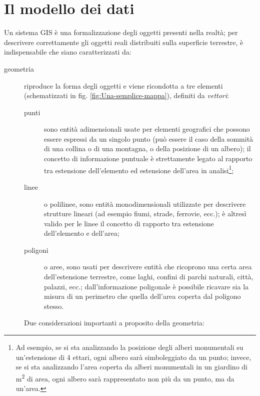 \section{Il modello dei dati
}

	Un sistema GIS è una formalizzazione degli oggetti presenti nella realtà; per descrivere correttamente gli oggetti reali distribuiti sulla superficie terrestre, è indispensabile che siano caratterizzati da:
	
	\begin{description}
		\item [{geometria}] riproduce la forma degli oggetti e viene ricondotta a tre elementi (schematizzati in fig. \ref{fig:Una-semplice-mappa}), definiti da \emph{vettori}:

			\begin{description}
				\item [{punti}] sono entità adimensionali usate per elementi geografici che possono essere espressi da un singolo punto (può essere il caso della sommità di una collina o di una montagna, o della posizione di un albero); il concetto di informazione puntuale è strettamente legato al rapporto tra estensione dell'elemento ed estensione dell'area in analisi\footnote{Ad esempio, se si sta analizzando la posizione degli alberi monumentali su un'estensione di 4 ettari, ogni albero sarà simboleggiato da un punto; invece, se si sta analizzando l'area coperta da alberi monumentali in un giardino di \unit{\meter\squared} di area, ogni albero sarà rappresentato non più da un punto, ma da un'area.};
				\item [{linee}] o polilinee, sono entità monodimensionali utilizzate per descrivere strutture lineari (ad esempio fiumi, strade, ferrovie, ecc.); è altresì valido per le linee il concetto di rapporto tra estensione dell'elemento e dell'area;
				\item [{poligoni}] o aree, sono usati per descrivere entità che ricoprono una certa area dell'estensione terrestre, come laghi, confini di parchi naturali, città, palazzi, ecc.; dall'informazione poligonale è possibile ricavare sia la misura di un perimetro che quella dell'area coperta dal poligono stesso. 
			\end{description}
			
			Due considerazioni importanti a proposito della geometria:
		

\end{description}
